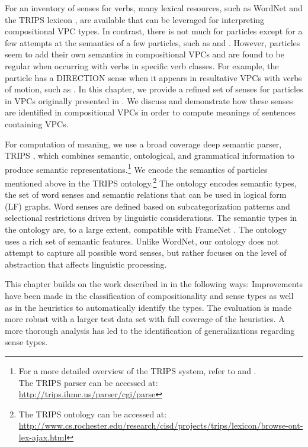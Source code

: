 \documentclass[output=paper
,modfonts
,nonflat]{langsci/langscibook}
\begin{document}
For an inventory of senses for verbs, many lexical resources, such as WordNet \citep{Mil95,Fel98} and the TRIPS lexicon \citep{All17}, are available that can be leveraged for interpreting compositional VPC types. In contrast, there is not much for particles except for a few attempts at the semantics of a few particles, such as  \citep{Coo06} and  \citep{Tyl03}. However, particles seem to add their own semantics in compositional VPCs and are found to be regular when occurring with verbs in specific verb classes. For example, the particle  has a DIRECTION sense when it appears in resultative VPCs with verbs of motion, such as  \citep{Vil06}. In this chapter, we provide a refined set of senses for particles in VPCs originally presented in \citet{Bha17}. We discuss and demonstrate how these senses are identified in compositional VPCs in order to compute meanings of sentences containing VPCs. 

For computation of meaning, we use a broad coverage deep semantic parser, TRIPS \citep{All07}, which combines semantic, ontological, and grammatical information to produce semantic representations.\footnote{For a more detailed overview of the TRIPS system, refer to \citet{All17} and \citet{All08}.\\The TRIPS parser can be accessed at: \url{http://trips.ihmc.us/parser/cgi/parse}} We encode the semantics of particles mentioned above in the TRIPS ontology.\footnote{The TRIPS ontology can be accessed at: \url{http://www.cs.rochester.edu/research/cisd/projects/trips/lexicon/browse-ont-lex-ajax.html}} The ontology encodes semantic types, the set of word senses and semantic relations that can be used in logical form (LF) graphs. Word senses are defined based on subcategorization patterns and selectional restrictions driven by linguistic considerations. The semantic types in the ontology are, to a large extent, compatible with FrameNet \citep{Joh00}. The ontology uses a rich set of semantic features. Unlike WordNet, our ontology does not attempt to capture all possible word senses, but rather focuses on the level of abstraction that affects linguistic processing.

This chapter builds on the work described in \citet{Bha17} in the following ways: Improvements have been made in the classification of compositionality and sense types as well as in the heuristics to automatically identify the types. The evaluation is made more robust with a larger test data set with full coverage of the heuristics. A more thorough analysis has led to the identification of generalizations regarding sense types. 
\end{document}
